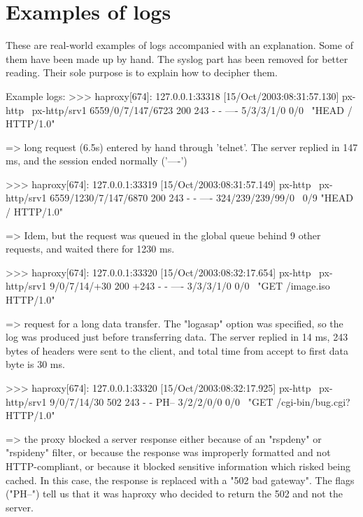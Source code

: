 \section{Examples of logs}
\label{sec:examples_of_logs}

These are real-world examples of logs accompanied with an explanation. Some of
them have been made up by hand. The syslog part has been removed for better
reading. Their sole purpose is to explain how to decipher them.

\begin{example}{Example logs:}
    >>> haproxy[674]: 127.0.0.1:33318 [15/Oct/2003:08:31:57.130] px-http \
          px-http/srv1 6559/0/7/147/6723 200 243 - - ---- 5/3/3/1/0 0/0 \
          "HEAD / HTTP/1.0"

    => long request (6.5s) entered by hand through 'telnet'. The server replied
       in 147 ms, and the session ended normally ('----')

    >>> haproxy[674]: 127.0.0.1:33319 [15/Oct/2003:08:31:57.149] px-http \
          px-http/srv1 6559/1230/7/147/6870 200 243 - - ---- 324/239/239/99/0 \
          0/9 "HEAD / HTTP/1.0"

    => Idem, but the request was queued in the global queue behind 9 other
       requests, and waited there for 1230 ms.

    >>> haproxy[674]: 127.0.0.1:33320 [15/Oct/2003:08:32:17.654] px-http \
          px-http/srv1 9/0/7/14/+30 200 +243 - - ---- 3/3/3/1/0 0/0 \
          "GET /image.iso HTTP/1.0"

    => request for a long data transfer. The "logasap" option was specified, so
       the log was produced just before transferring data. The server replied in
       14 ms, 243 bytes of headers were sent to the client, and total time from
       accept to first data byte is 30 ms.

    >>> haproxy[674]: 127.0.0.1:33320 [15/Oct/2003:08:32:17.925] px-http \
          px-http/srv1 9/0/7/14/30 502 243 - - PH-- 3/2/2/0/0 0/0 \
          "GET /cgi-bin/bug.cgi? HTTP/1.0"

    => the proxy blocked a server response either because of an "rspdeny" or
       "rspideny" filter, or because the response was improperly formatted and
       not HTTP-compliant, or because it blocked sensitive information which
       risked being cached. In this case, the response is replaced with a "502
       bad gateway". The flags ("PH--") tell us that it was haproxy who decided
       to return the 502 and not the server.


\end{example}
